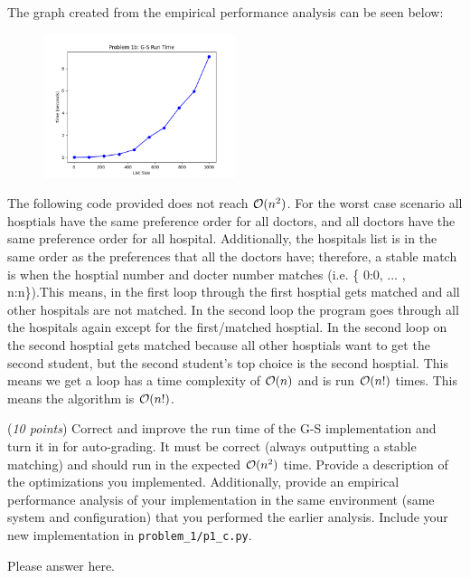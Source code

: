 \documentclass{hw}
\begin{document}
\begin{problem}
\begin{solution}
    The graph created from the empirical performance analysis can be seen below:
    \begin{figure}[h]
      \centering
          \includegraphics[width=0.5\textwidth]{figures/problem-1b.png}
    \end{figure}



    The following code provided does not reach $\mathcal{O}(n^2)$. For the worst case scenario all hosptials have the same preference order for all doctors, and all doctors have the same preference order for all hospital. Additionally, the hospitals list is in the same order as the preferences that all the doctors have; therefore, a stable match is when the hosptial number and docter number matches (i.e. \{ 0:0, ... , n:n\}).This means, in the first loop through the first hosptial gets matched and all other hospitals are not matched. In the second loop the program goes through all the hospitals again except for the first/matched hosptial. In the second loop on the second hosptial gets matched because all other hosptials want to get the second student, but the second student's top choice is the second hosptial. This means we get a loop has a time complexity of $\mathcal{O}(n)$ and is run $\mathcal{O}(n!)$ times. This means the algorithm is $\mathcal{O}(n!)$.  



\end{solution}

\begin{subproblem}
\newcommand{\worstrank}{{\tt wr}}
(\textit{10 points})
Correct and improve the run time of the G-S implementation and turn it in for
  auto-grading. It must be correct (always outputting a stable matching) and should run in the expected $\mathcal{O}(n^2)$ time. 
  Provide a description of the optimizations you implemented.
  Additionally, provide an empirical performance analysis of your
  implementation in the same environment (same system and configuration) that
  you performed the earlier analysis. Include your new implementation in \texttt{problem\_1/p1\_c.py}.
\end{subproblem}

\begin{solution}
Please answer here.
\end{solution}

\end{problem}
\end{document}
